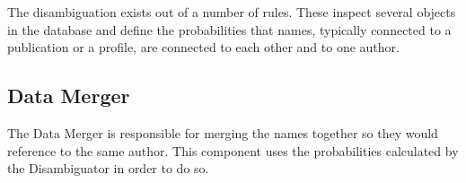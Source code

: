 The disambiguation exists out of a number of rules. These inspect several objects in the database and define the probabilities that names, typically connected to a publication or a profile, are connected to each other and to one author. %

\subsection{Data Merger}

The Data Merger is responsible for merging the names together so they would reference to the same author. This component uses the probabilities calculated by the Disambiguator in order to do so.

%
%
%
%
%
%
%
%
%
%
%
